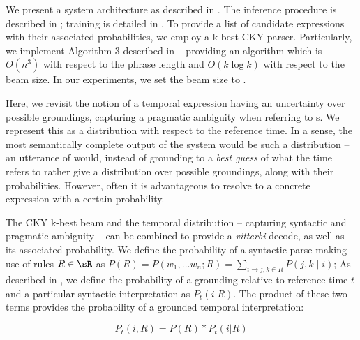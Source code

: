 We present a system architecture as described in .
The inference procedure is described in ;
	training is detailed in .
To provide a list of
	candidate expressions with their associated probabilities, we
	employ a k-best CKY parser.
Particularly, we implement Algorithm 3 described in 
	 -- providing an algorithm which is
	$O(n^3)$ with respect to the phrase length and $O(k\log k)$ with respect
	to the beam size.
In our experiments, we set the beam size to .

Here, we revisit the notion of a temporal expression having an uncertainty
	over possible groundings, capturing a pragmatic ambiguity when
	referring to s.
We represent this as a distribution with respect to the reference time.
In a sense, the most semantically complete output of the system would be
	such a distribution -- 
	an utterance of  would, instead of grounding to a 
	\textit{best guess} of what the time refers to rather give a distribution
	over possible groundings, along with their probabilities.
However, often it is advantageous to resolve to a concrete expression with a
	certain probability.

The CKY k-best beam and the temporal distribution 
	-- capturing syntactic and pragmatic ambiguity --
	can be combined to provide a \textit{vitterbi} decode, as well as
	its associated probability.
We define the probability of a syntactic parse making use of rules $R \in \sR$ 
	as $P(R) = P(w_1,\dots w_n; R) = \sum_{i \rightarrow j,k \in R}P(j,k \mid i)$;
	As described in , we define the probability of a 
	grounding relative to reference time $t$ and a particular
	syntactic interpretation as $P_t(i | R)$.
The product of these two terms provides the probability of a grounded temporal
	interpretation:

\begin{equation}
	P_t(i, R) = 
		P( R ) * P_t(i | R)
\label{eqn:prob}
\end{equation}


